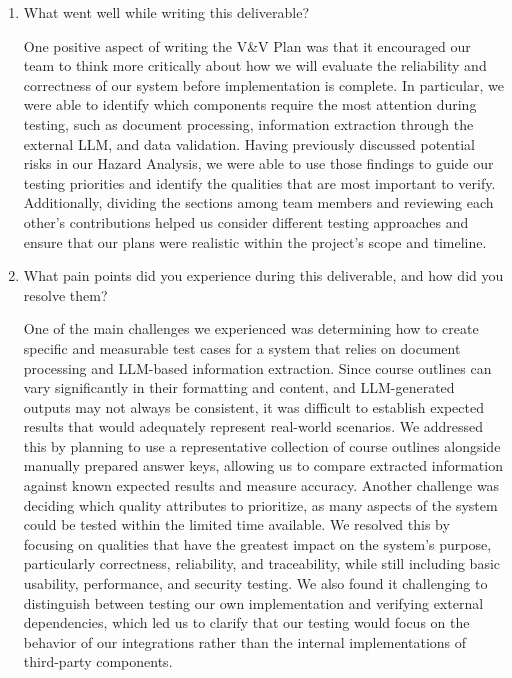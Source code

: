 \documentclass[12pt, titlepage]{article}
\begin{document}
\begin{enumerate}
  \item What went well while writing this deliverable?

One positive aspect of writing the V\&V Plan was that it encouraged our team to think more 
critically about how we will evaluate the reliability and correctness of our system before 
implementation is complete. In particular, we were able to identify which components require 
the most attention during testing, such as document processing, information extraction through 
the external LLM, and data validation. Having previously discussed potential risks in our 
Hazard Analysis, we were able to use those findings to guide our testing priorities and 
identify the qualities that are most important to verify. Additionally, dividing the sections 
among team members and reviewing each other's contributions helped us consider different 
testing approaches and ensure that our plans were realistic within the project's scope and timeline.

  \item What pain points did you experience during this deliverable, and how
    did you resolve them?

One of the main challenges we experienced was determining how to create specific and measurable 
test cases for a system that relies on document processing and LLM-based information extraction. 
Since course outlines can vary significantly in their formatting and content, and LLM-generated 
outputs may not always be consistent, it was difficult to establish expected results that would 
adequately represent real-world scenarios. We addressed this by planning to use a representative 
collection of course outlines alongside manually prepared answer keys, allowing us to compare 
extracted information against known expected results and measure accuracy. Another challenge 
was deciding which quality attributes to prioritize, as many aspects of the system could be 
tested within the limited time available. We resolved this by focusing on qualities that have 
the greatest impact on the system's purpose, particularly correctness, reliability, and 
traceability, while still including basic usability, performance, and security testing. We 
also found it challenging to distinguish between testing our own implementation and verifying 
external dependencies, which led us to clarify that our testing would focus on the behavior of 
our integrations rather than the internal implementations of third-party components.
  

\end{enumerate}
\end{document}

